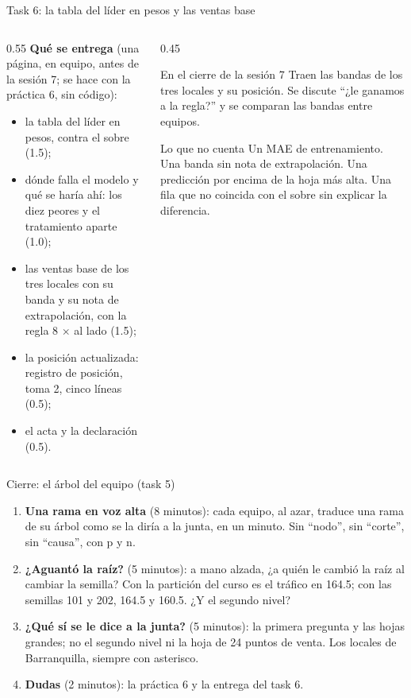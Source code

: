 \documentclass{beamer}
\begin{document}
\begin{frame}{Task 6: la tabla del líder en pesos y las ventas base}
\small
\begin{columns}[T]
\begin{column}{0.55\textwidth}
\textbf{Qué se entrega} (una página, en equipo, antes de la sesión 7; se hace con la práctica 6, sin código):
\begin{itemize}\itemsep3pt
  \item la tabla del líder en pesos, contra el sobre (1.5);
  \item dónde falla el modelo y qué se haría ahí: los diez peores y el tratamiento aparte (1.0);
  \item las ventas base de los tres locales con su banda y su nota de extrapolación, con la regla 8 $\times$ al lado (1.5);
  \item la posición actualizada: registro de posición, toma 2, cinco líneas (0.5);
  \item el acta y la declaración (0.5).
\end{itemize}
\end{column}
\begin{column}{0.45\textwidth}
\begin{exampleblock}{En el cierre de la sesión 7}
Traen las bandas de los tres locales y su posición. Se discute ``¿le ganamos a la regla?'' y se comparan las bandas entre equipos.
\end{exampleblock}
\begin{alertblock}{Lo que no cuenta}
Un MAE de entrenamiento. Una banda sin nota de extrapolación. Una predicción por encima de la hoja más alta. Una fila que no coincida con el sobre sin explicar la diferencia.
\end{alertblock}
\end{column}
\end{columns}
\end{frame}

\begin{frame}{Cierre: el árbol del equipo (task 5)}
\begin{enumerate}\itemsep6pt
  \item \textbf{Una rama en voz alta} (8 minutos): cada equipo, al azar, traduce una rama de su árbol como se la diría a la junta, en un minuto. Sin ``nodo'', sin ``corte'', sin ``causa'', con p y n.
  \item \textbf{¿Aguantó la raíz?} (5 minutos): a mano alzada, ¿a quién le cambió la raíz al cambiar la semilla? Con la partición del curso es el tráfico en 164.5; con las semillas 101 y 202, 164.5 y 160.5. ¿Y el segundo nivel?
  \item \textbf{¿Qué sí se le dice a la junta?} (5 minutos): la primera pregunta y las hojas grandes; no el segundo nivel ni la hoja de 24 puntos de venta. Los locales de Barranquilla, siempre con asterisco.
  \item \textbf{Dudas} (2 minutos): la práctica 6 y la entrega del task 6.
\end{enumerate}
\end{frame}
\end{document}
